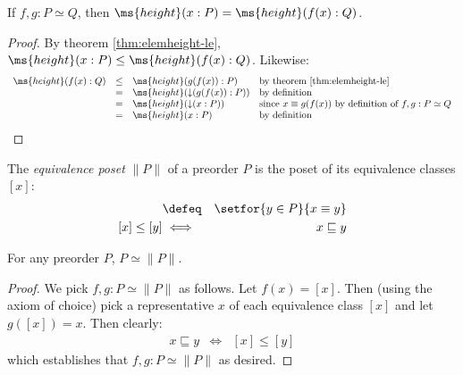 \documentclass{article}
\newcommand{\ale}{\sqsubseteq}
\newcommand{\aeq}{\equiv}
\newcommand{\ordeq}{\simeq}
\newcommand{\eqposet}[1]{\ms{Eq}(#1)}
\renewcommand{\eqposet}[1]{\|{#1}\|}
\newcommand{\eqclass}[1]{[#1]}
\newcommand{\height}{\ms{height}}
\newcommand{\elemheight}[2]{\height(#2 : #1)}
\newcommand{\down}[2]{\mathop{\downarrow}(#2 : #1)}
\begin{document}
\begin{theorem}
  If $f,g : P \ordeq Q$, then $\elemheight{P}{x} = \elemheight{Q}{f(x)}$.
\end{theorem}
\begin{proof}
  By theorem \ref{thm:elemheight-le}, $\elemheight{P}{x} \le
  \elemheight{Q}{f(x)}$. Likewise:
  \[
  \begin{array}{rcll}
    \elemheight{Q}{f(x)}
    &\le& \elemheight{P}{g(f(x))} & \text{by theorem \ref{thm:elemheight-le}}\\
    &=& \height(\down{P}{g(f(x))}) & \text{by definition}\\
    &=& \height(\down{P}{x})
    & \text{since}~x \equiv g(f(x))~\text{by definition of}~f,g : P \ordeq Q\\
    &=& \elemheight{P}{x} & \text{by definition}
  \end{array}
  \]
\end{proof}


\begin{definition}
  The \emph{equivalence poset} $\eqposet{P}$ of a preorder $P$ is the poset of
  its equivalence classes $\eqclass{x}$:
  \begin{eqnarray*}
    \eqclass{x}  &\defeq&  \setfor{y \in P}{x \aeq y}\\
    \eqclass{x} \le \eqclass{y} &\iff& x \ale y
  \end{eqnarray*}
\end{definition}

\begin{theorem}
  \label{thm:eqposet}
  For any preorder $P$, $P \ordeq \eqposet{P}$.
\end{theorem}
\begin{proof}
  We pick $f,g : P \ordeq \eqposet{P}$ as follows. Let $f(x) = \eqclass{x}$.
  Then (using the axiom of choice) pick a representative $x$ of each equivalence
  class $\eqclass{x}$ and let $g(\eqclass{x}) = x$. Then clearly:
  \begin{eqnarray*}
    x \ale y &\iff& \eqclass{x} \le \eqclass{y}
  \end{eqnarray*}
  which establishes that $f,g : P \ordeq \eqposet{P}$ as desired.
\end{proof}

\end{document}
